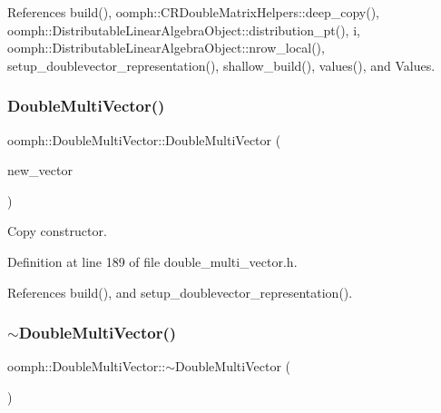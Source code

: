 References build(), oomph\+::\+C\+R\+Double\+Matrix\+Helpers\+::deep\+\_\+copy(), oomph\+::\+Distributable\+Linear\+Algebra\+Object\+::distribution\+\_\+pt(), i, oomph\+::\+Distributable\+Linear\+Algebra\+Object\+::nrow\+\_\+local(), setup\+\_\+doublevector\+\_\+representation(), shallow\+\_\+build(), values(), and Values.

\mbox{\label{classoomph_1_1DoubleMultiVector_af9eb30b7fa130f8d6211b8f63c962e68}} 
\subsubsection{\texorpdfstring{Double\+Multi\+Vector()}{DoubleMultiVector()}\hspace{0.1cm}{\footnotesize\ttfamily [7/7]}}
{\footnotesize\ttfamily oomph\+::\+Double\+Multi\+Vector\+::\+Double\+Multi\+Vector (\begin{DoxyParamCaption}\item[{const \hyperlink{classoomph_1_1DoubleMultiVector}{Double\+Multi\+Vector} \&}]{new\+\_\+vector }\end{DoxyParamCaption})\hspace{0.3cm}{\ttfamily [inline]}}



Copy constructor. 



Definition at line 189 of file double\+\_\+multi\+\_\+vector.\+h.



References build(), and setup\+\_\+doublevector\+\_\+representation().

\mbox{\label{classoomph_1_1DoubleMultiVector_a551268cff3ee84866a102db6fb1fd6b0}} 
\subsubsection{\texorpdfstring{$\sim$\+Double\+Multi\+Vector()}{~DoubleMultiVector()}}
{\footnotesize\ttfamily oomph\+::\+Double\+Multi\+Vector\+::$\sim$\+Double\+Multi\+Vector (\begin{DoxyParamCaption}{ }\end{DoxyParamCaption})\hspace{0.3cm}{\ttfamily [inline]}}



